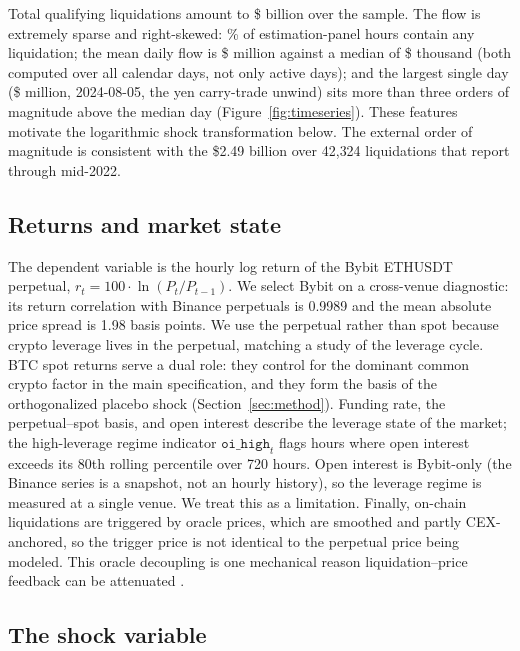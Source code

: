 Total qualifying liquidations amount to \$\LiqTotalBn{} billion over the
sample. The flow is extremely sparse and right-skewed: \PLiqAll\% of
estimation-panel hours contain any liquidation; the mean daily flow is
\$\MeanDailyLiqM{} million against a median of \$\MedianDailyLiqK{}
thousand (both computed over all calendar days, not only active days); and the largest single day (\$\MaxDayM{} million, 2024-08-05, the
yen carry-trade unwind) sits more than three orders of magnitude above the
median day (Figure~\ref{fig:timeseries}). These features motivate the
logarithmic shock transformation below. The external order of magnitude is
consistent with the \$2.49 billion over 42{,}324 liquidations that
\citet{lehar2022} report through mid-2022.

\subsection{Returns and market state}

The dependent variable is the hourly log return of the Bybit ETHUSDT
perpetual, $r_t = 100 \cdot \ln(P_t/P_{t-1})$. We select Bybit on a
cross-venue diagnostic: its return correlation with Binance perpetuals is
0.9989 and the mean absolute price spread is 1.98 basis points. We use the
perpetual rather than spot because crypto leverage lives in the perpetual,
matching a study of the leverage cycle. BTC spot returns serve a dual role:
they control for the dominant common crypto factor in the main
specification, and they form the basis of the orthogonalized placebo shock
(Section~\ref{sec:method}). Funding rate, the perpetual--spot basis, and
open interest describe the leverage state of the market; the high-leverage
regime indicator $\texttt{oi\_high}_t$ flags hours where open interest
exceeds its 80th rolling percentile over 720 hours. Open interest is
Bybit-only (the Binance series is a snapshot, not an hourly history), so the
leverage regime is measured at a single venue. We treat this as a
limitation. Finally, on-chain liquidations are triggered by oracle prices,
which are smoothed and partly CEX-anchored, so the trigger price is not
identical to the perpetual price being modeled. This oracle decoupling is
one mechanical reason liquidation--price feedback can be attenuated
\citep{caldarelli2020,liuszalachowski2021}.

\subsection{The shock variable}


